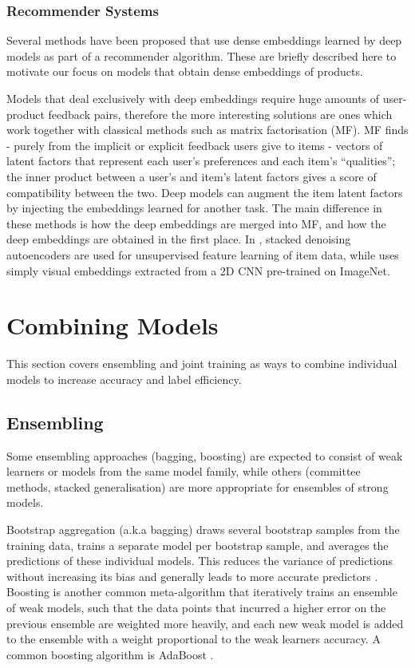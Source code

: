 \subsubsection{Recommender Systems}
\label{rec}

Several methods have been proposed that use dense embeddings learned by deep models as part of a recommender algorithm.
These are briefly described here to motivate our focus on models that obtain dense embeddings of products.

Models that deal exclusively with deep embeddings \cite{mvdl} require huge amounts of user-product feedback pairs, therefore the more interesting solutions are ones which work together with classical methods such as matrix factorisation (MF).
MF finds - purely from the implicit or explicit feedback users give to items - vectors of latent factors that represent each user's preferences and each item's ``qualities''; the inner product between a user's and item's latent factors gives a score of compatibility between the two.
Deep models can augment the item latent factors by injecting the embeddings learned for another task.
The main difference in these methods is how the deep embeddings are merged into MF, and how the deep embeddings are obtained in the first place.
In \cite{cdl}, stacked denoising autoencoders are used for unsupervised feature learning of item data, while \cite{dl_mf} uses simply visual embeddings extracted from a 2D CNN pre-trained on ImageNet.

\section{Combining Models}
\label{bg_ensembling}

This section covers ensembling and joint training as ways to combine individual models to increase accuracy and label efficiency.

\subsection{Ensembling}
Some ensembling approaches (bagging, boosting)  are expected to consist of weak learners or models from the same model family, while others (committee methods, stacked generalisation) are more appropriate for ensembles of strong models.

Bootstrap aggregation (a.k.a bagging)   draws several bootstrap samples  from the training data,  trains a separate model per bootstrap sample,  and averages the predictions of these individual models.  This reduces the variance of predictions without increasing its bias and generally leads to  more accurate predictors \cite{bagging}.
Boosting is another common meta-algorithm that iteratively trains an ensemble of weak models, such that the data points that incurred a higher error on the previous ensemble are weighted more heavily, and each new weak model is added to the ensemble with a weight proportional to the weak learners accuracy.
A common boosting algorithm is AdaBoost \cite{adaboost}.

